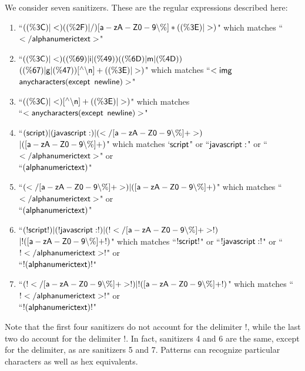 We consider seven sanitizers. These are the regular expressions described here:
\begin{enumerate}
	\item ``$\sf{((\%3C)|<)((\%2F)|/)[a-zA-Z0-9\backslash\%]*((\%3E)|>)}$" which matches ``$\sf{</alphanumerictext>}$"
	\item ``$\sf{((\%3C)|<)((\%69)|i|(\%49))((\%6D)|m|(\%4D))}$\\$\sf{((\%67)|g|(\%47))[^\wedge\backslash n]+((\%3E)|>)}$" which matches ``$\sf{<img}$ $\sf{anycharacters(except}$ $\sf{newline)>}$"
	\item ``$\sf{((\%3C)|<)[^\wedge\backslash n]+((\%3E)|>)}$" which matches \\``$\sf{<anycharacters(except}$ $\sf{newline)>}$"
	\item ``$\sf{(script)|(javascript:)|(</[a-zA-Z0-9\backslash\%]+>)}$\\$\sf{|([a-zA-Z0-9\backslash\%]+)}$" which matches `$\sf{script}$" or ``$\sf{javascript:}$" or ``$\sf{</alphanumerictext>}$" or \\``$\sf{(alphanumerictext)}$"
	\item ``$\sf{(</[a-zA-Z0-9\backslash\%]+>)|([a-zA-Z0-9\backslash\%]+)}$" which matches ``$\sf{</alphanumerictext>}$" or\\ ``$\sf{(alphanumerictext)}$"
	\item ``$\sf{(!script!)|(!javascript:!)|(!</[a-zA-Z0-9\backslash\%]+>!)}$\\$\sf{|!([a-zA-Z0-9\backslash\%]+!)}$" which matches ``$\sf{!script!}$" or ``$\sf{!javascript:!}$" or ``$\sf{!</alphanumerictext>!}$" or \\ ``$\sf{!(alphanumerictext)!}$"
	\item ``$\sf{(!</[a-zA-Z0-9\backslash\%]+>!)|!([a-zA-Z0-9\backslash\%]+!)}$" which matches ``$\sf{!</alphanumerictext>!}$" or\\ ``$\sf{!(alphanumerictext)!}$"
\end{enumerate}
Note that the first four sanitizers do not account for the delimiter $!$, while the last two do account for the delimiter $!$. In fact, sanitizers 4 and 6 are the same, except for the delimiter, as are sanitizers 5 and 7. Patterns can recognize particular characters as well as hex equivalents. 

